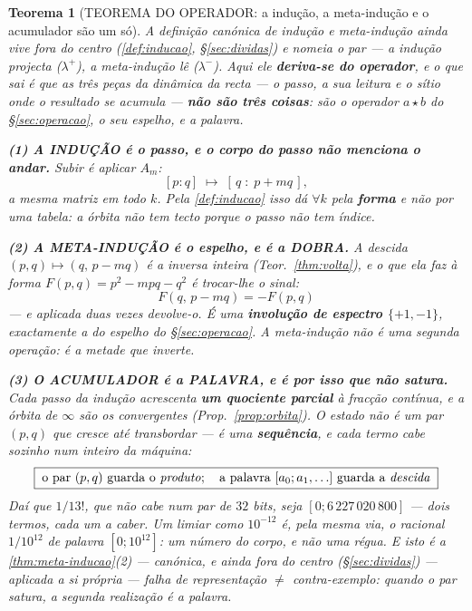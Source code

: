 \documentclass[11pt,a4paper]{article}
\newtheorem{teorema}{Teorema}
\begin{document}
\begin{teorema}[TEOREMA DO OPERADOR: a indução, a meta-indução e o acumulador são um
só]\label{thm:operador}
A definição canónica de indução e meta-indução ainda vive fora do centro (\ref{def:inducao}, \S\ref{sec:dividas}) e nomeia o par --- a indução projecta
($\lambda^{+}$), a meta-indução lê ($\lambda^{-}$). Aqui ele \textbf{deriva-se do
operador}, e o que sai é que as três peças da dinâmica da recta --- o passo, a sua leitura
e o sítio onde o resultado se acumula --- \textbf{não são três coisas}: são o operador
$a\star b$ do \S\ref{sec:operacao}, o seu espelho, e a palavra.

\textbf{(1) A INDUÇÃO é o passo, e o corpo do passo não menciona o andar.} Subir é aplicar
$A_m$:
\[
[p:q]\;\longmapsto\;[\,q\;:\;p+mq\,],
\]
a mesma matriz em todo $k$. Pela \ref{def:inducao} isso dá $\forall k$ pela
\textbf{forma} e não por uma tabela: \emph{a órbita não tem tecto porque o passo não tem
índice}.

\textbf{(2) A META-INDUÇÃO é o espelho, e é a DOBRA.} A descida $(p,q)\mapsto(q,\,p-mq)$ é
a inversa inteira (Teor.~\ref{thm:volta}), e o que ela faz à forma
$F(p,q)=p^{2}-mpq-q^{2}$ é \emph{trocar-lhe o sinal}:
\[
\boxed{\;F(q,\,p-mq)=-F(p,q)\;}
\]
--- e aplicada duas vezes devolve-o. É uma \textbf{involução de espectro $\{+1,-1\}$},
exactamente a do espelho do \S\ref{sec:operacao}. \emph{A meta-indução não é uma segunda
operação: é a metade que inverte.}

\textbf{(3) O ACUMULADOR é a PALAVRA, e é por isso que não satura.} Cada passo da indução
acrescenta \textbf{um quociente parcial} à fracção contínua, e a órbita de $\infty$ são os
convergentes (Prop.~\ref{prop:orbita}). O estado não é um par $(p,q)$ que cresce até
transbordar --- é uma \textbf{sequência}, e cada termo cabe sozinho num inteiro da máquina:
\[
\boxed{\;\text{o par }(p,q)\text{ guarda o \emph{produto}};\quad
        \text{a palavra }[a_0;a_1,\ldots]\text{ guarda a \emph{descida}}\;}
\]
Daí que $1/13!$, que não cabe num par de $32$ bits, seja $[0;6\,227\,020\,800]$ --- dois
termos, cada um a caber. \emph{Um limiar como $10^{-12}$ é, pela mesma via, o racional
$1/10^{12}$ de palavra $[0;10^{12}]$: um número do corpo, e não uma régua.} E isto é a
\ref{thm:meta-inducao}(2) --- canónica, e ainda fora do centro (\S\ref{sec:dividas}) --- aplicada a si própria --- \emph{falha de representação
$\neq$ contra-exemplo}: quando o par satura, a segunda realização é a palavra.


\end{teorema}
\end{document}
